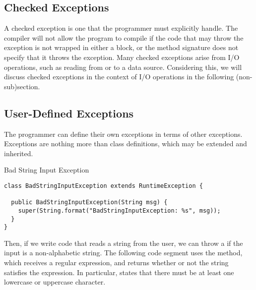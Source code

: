 \subsection{Checked Exceptions}

A checked exception is one that the programmer must explicitly handle. The compiler will not allow the program to compile if the code that may throw the exception is not wrapped in either a  block, or the method signature does not specify that it throws the exception. Many checked exceptions arise from I/O operations, such as reading from or to a data source. Considering this, we will discuss checked exceptions in the context of I/O operations in the following (non-sub)section.

\subsection{User-Defined Exceptions}
The programmer can define their own exceptions in terms of other exceptions. Exceptions are nothing more than class definitions, which may be extended and inherited. 


\begin{cl}[]{Bad String Input Exception}
\begin{lstlisting}[language=MyJava]
class BadStringInputException extends RuntimeException {
  
  public BadStringInputException(String msg) {
    super(String.format("BadStringInputException: %s", msg));
  }
}
\end{lstlisting}
\end{cl}

Then, if we write code that reads a string from the user, we can throw a  if the input is a non-alphabetic string. The following code segment uses the  method, which receives a regular expression, and returns whether or not the string satisfies the expression. In particular, \ttt{[a-zA-Z]+} states that there must be at least one lowercase or uppercase character.

